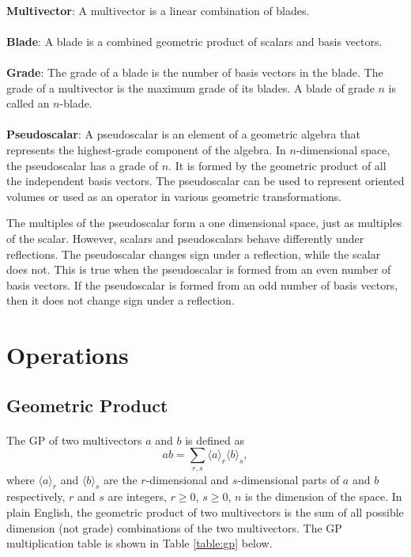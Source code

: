 \documentclass{article}
\begin{document}
\paragraph{}\textbf{Multivector}: A multivector is a linear combination of blades.

\paragraph{}\textbf{Blade}: A blade is a combined geometric product of scalars and basis vectors.

\paragraph{}\textbf{Grade}: The grade of a blade is the number of basis vectors in the blade. 
The grade of a multivector is the maximum grade of its blades. A blade of grade $n$ is called an $n$-blade.

\paragraph{}\textbf{Pseudoscalar}: A pseudoscalar is an element of a geometric algebra that represents the 
highest-grade component of the algebra. In $n$-dimensional space, the pseudoscalar has a grade of $n$. It is 
formed by the geometric product of all the independent basis vectors. The pseudoscalar can be used to 
represent oriented volumes or used as an operator in various geometric transformations.

The multiples of the pseudoscalar form a one dimensional space, just as multiples of the scalar. However, 
scalars and pseudoscalars behave differently under reflections. The pseudoscalar changes sign under a
reflection, while the scalar does not. This is true when the pseudoscalar is formed from an even number of
basis vectors. If the pseudoscalar is formed from an odd number of basis vectors, then it does not change
sign under a reflection.

\section{Operations}

\subsection{\textbf{Geometric Product}}

\paragraph{}
    The GP of two multivectors $a$ and $b$ is defined as $$ab = \sum_{r,s} \langle a \rangle_{r} \langle b \rangle_{s},$$
    where $\langle a \rangle_r$ and $\langle b \rangle_s$ are the $r$-dimensional and $s$-dimensional parts of $a$ and $b$
    respectively, $r$ and $s$ are integers, $r \geq 0$, $s \geq 0$, $n$ is the dimension of the space.
    In plain English, the geometric product of two multivectors is the sum of all possible dimension (not grade) 
    combinations of the two multivectors. The GP multiplication table is shown in Table \ref{table:gp} below.
\end{document}
